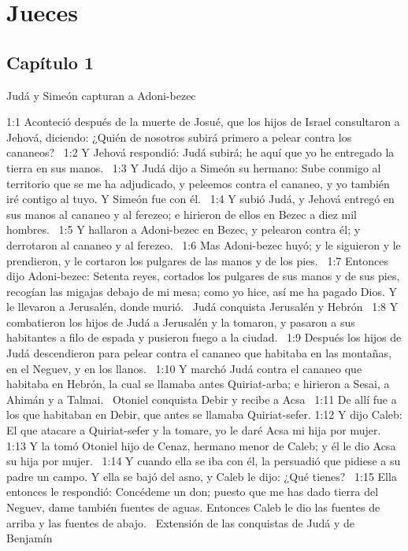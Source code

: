 
\chapter{Jueces}

\section*{Capítulo 1}
Judá y Simeón capturan a Adoni-bezec  

1:1 Aconteció después de la muerte de Josué, que los hijos de Israel consultaron a Jehová, diciendo: ¿Quién de nosotros subirá primero a pelear contra los cananeos?  
1:2 Y Jehová respondió: Judá subirá; he aquí que yo he entregado la tierra en sus manos.  
1:3 Y Judá dijo a Simeón su hermano: Sube conmigo al territorio que se me ha adjudicado, y peleemos contra el cananeo, y yo también iré contigo al tuyo. Y Simeón fue con él.  
1:4 Y subió Judá, y Jehová entregó en sus manos al cananeo y al ferezeo; e hirieron de ellos en Bezec a diez mil hombres.  
1:5 Y hallaron a Adoni-bezec en Bezec, y pelearon contra él; y derrotaron al cananeo y al ferezeo.  
1:6 Mas Adoni-bezec huyó; y le siguieron y le prendieron, y le cortaron los pulgares de las manos y de los pies.  
1:7 Entonces dijo Adoni-bezec: Setenta reyes, cortados los pulgares de sus manos y de sus pies, recogían las migajas debajo de mi mesa; como yo hice, así me ha pagado Dios. Y le llevaron a Jerusalén, donde murió.  
Judá conquista Jerusalén y Hebrón  
1:8 Y combatieron los hijos de Judá a Jerusalén y la tomaron, y pasaron a sus habitantes a filo de espada y pusieron fuego a la ciudad.  
1:9 Después los hijos de Judá descendieron para pelear contra el cananeo que habitaba en las montañas, en el Neguev, y en los llanos.  
1:10 Y marchó Judá contra el cananeo que habitaba en Hebrón, la cual se llamaba antes Quiriat-arba; e hirieron a Sesai, a Ahimán y a Talmai.  
Otoniel conquista Debir y recibe a Acsa   
1:11 De allí fue a los que habitaban en Debir, que antes se llamaba Quiriat-sefer. 
1:12 Y dijo Caleb: El que atacare a Quiriat-sefer y la tomare, yo le daré Acsa mi hija por mujer.  
1:13 Y la tomó Otoniel hijo de Cenaz, hermano menor de Caleb; y él le dio Acsa su hija por mujer.  
1:14 Y cuando ella se iba con él, la persuadió que pidiese a su padre un campo. Y ella se bajó del asno, y Caleb le dijo: ¿Qué tienes?  
1:15 Ella entonces le respondió: Concédeme un don; puesto que me has dado tierra del Neguev, dame también fuentes de aguas. Entonces Caleb le dio las fuentes de arriba y las fuentes de abajo.  
Extensión de las conquistas de Judá y de Benjamín  
